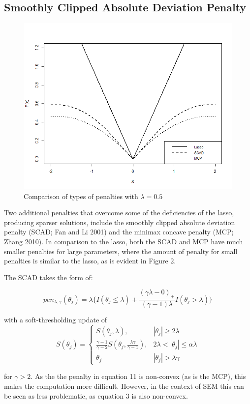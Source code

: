\documentclass[article]{jss}
\begin{document}
\subsection{Smoothly Clipped Absolute Deviation
Penalty}\label{smoothly-clipped-absolute-deviation-penalty}

\begin{figure}
    \centering
    \includegraphics[width=.5\linewidth]{figs/penalties}
    \caption{Comparison of types of penalties with $\lambda=0.5$}
\end{figure}

Two additional penalties that overcome some of the deficiencies of the
lasso, producing sparser solutions, include the smoothly clipped
absolute deviation penalty (SCAD; Fan and Li 2001) and the minimax
concave penalty (MCP; Zhang 2010). In comparison to the lasso, both the
SCAD and MCP have much smaller penalties for large parameters, where the
amount of penalty for small penalties is similar to the lasso, as is
evident in Figure 2.

The SCAD takes the form of:

\[
pen_{\lambda,\gamma}(\theta_{j}) = \lambda \big\{I(\theta_{j}\leq\lambda) + \frac{(\gamma \lambda-0)_{+}}{(\gamma-1)\lambda}I(\theta_{j}>\lambda)\big\}
\]

with a soft-thresholding update of \[
S(\theta_{j})= 
\begin{cases}
S(\theta_{j},\lambda),&  |\theta_{j}| \geq 2\lambda\\
\frac{\gamma-1}{\gamma-2}S(\theta_{j},\frac{\lambda\gamma}{\gamma-1}),              & 2\lambda < |\theta_{j}|\leq\alpha\lambda\\
\theta_{j} & |\theta_{j}| > \lambda \gamma
\end{cases}
\]

for \(\gamma > 2\). As the the penalty in equation 11 is non-convex (as
is the MCP), this makes the computation more difficult. However, in the
context of SEM this can be seen as less problematic, as equation 3 is
also non-convex.
\end{document}
